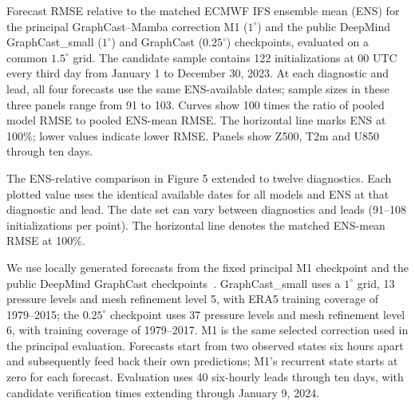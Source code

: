 
Forecast RMSE relative to the matched ECMWF IFS ensemble mean (ENS) for
the principal GraphCast--Mamba correction M1 ($1^\circ$) and the public
DeepMind GraphCast\_small ($1^\circ$) and GraphCast ($0.25^\circ$)
checkpoints, evaluated on a common $1.5^\circ$ grid.
The candidate sample contains 122 initializations at 00 UTC every third
day from January 1 to December 30, 2023. At each diagnostic and lead,
all four forecasts use the same ENS-available dates; sample sizes in these
three panels range from 91 to 103. Curves show 100 times the ratio of pooled model RMSE to
pooled ENS-mean RMSE. The horizontal line marks ENS at 100\%; lower
values indicate lower RMSE. Panels show Z500, T2m and U850 through ten days.

The ENS-relative comparison in Figure 5 extended to twelve diagnostics.
Each plotted value uses the identical available dates for all models
and ENS at that diagnostic and lead. The date set can vary between
diagnostics and leads (91--108 initializations per point).
The horizontal line denotes the matched ENS-mean RMSE at 100\%.

We use locally generated forecasts from the fixed principal M1 checkpoint
and the public DeepMind GraphCast checkpoints~\citep{lam2023graphcast}.
GraphCast\_small uses a $1^\circ$ grid, 13 pressure levels and mesh refinement
level 5, with ERA5 training coverage of 1979--2015; the $0.25^\circ$
checkpoint uses 37 pressure levels and mesh refinement level 6, with
training coverage of 1979--2017. M1 is the same selected correction used
in the principal evaluation. Forecasts start from two observed states
six hours apart and subsequently feed back their own predictions;
M1's recurrent state starts at zero for each forecast. Evaluation uses
40 six-hourly leads through ten days, with candidate verification times
extending through January 9, 2024.

